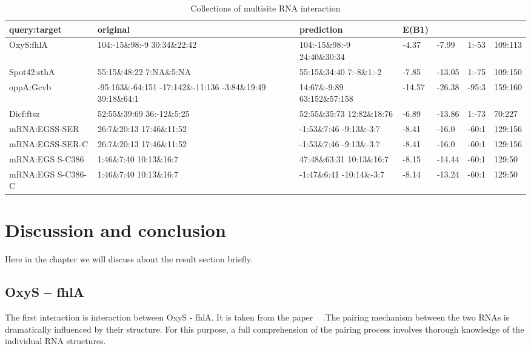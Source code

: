 \documentclass[twoside,a4paper]{report}
\begin{document}
	
\begin{table}[H]
	
	\label{table:2}
	\begin{tabular}{ p{2cm}p{2.8cm}|p{2.8cm}p{1cm}p{1cm}|p{1cm}p{1cm}}
		\hline
		query:target& original& prediction& \rotatebox[origin=c]{90} {E(B1)}  &\rotatebox[origin=c]{90}{E(B1+B2)}  &\rotatebox[origin=c]{90}{1st index}  &\rotatebox[origin=c]{90}{length} \\
		\hline
		OxyS:fhlA&104:-15\&98:-9 30:34\&22:42
		&104:-15\&98:-9 24:40\&30:34&-4.37 &-7.99 &1:-53&109:113\\
		\hline
		Spot42:sthA&55:15\&48:22  7:NA\&5:NA & 55:15\&34:40 7:-8\&1:-2
		& -7.85 &-13.05 & 1:-75 &109:150 \\
		\hline
		oppA:Gcvb &-95:163\&-64:151 -17:142\&-11:136 -3:84\&19:49 39:18\&64:1  &14:67\&-9:89 63:152\&57:158
		
		& -14.57 &-26.38 & -95:3 &159:160\\
		\hline
		Dicf:ftsz&52:55\&39:69   \hbox{36:-12\&5:25}  &52:55\&35:73 12:82\&18:76	& -6.89 &-13.86 &1:-73 &70:227 \\
		\hline
		mRNA:EGSS-SER &26:7\&20:13 17:46\&11:52  &-1:53\&7:46 \hbox{-9:13\&-3:7}
		 & -8.41 &-16.0 & -60:1 &129:156 \\
		\hline
		mRNA:EGSS-SER-C &26:7\&20:13 17:46\&11:52  &-1:53\&7:46 \hbox{-9:13\&-3:7}
		 & -8.41 &-16.0 & -60:1 &129:156 \\
		\hline
		mRNA:EGS S-C386 &1:46\&7:40 10:13\&16:7 &
		47:48\&63:31 10:13\&16:7
		  & -8.15&-14.44 & -60:1 &129:50 \\
		\hline
		mRNA:EGS S-C386-C &1:46\&7:40 10:13\&16:7
		 &-1:47\&6:41 \hbox{-10:14\&-3:7}
		  & -8.14 &-13.24 & -60:1 &129:50 \\
		\hline
	\end{tabular}
	\caption{Collections of multisite RNA interaction }	
\end{table}


	
	\chapter{Discussion and conclusion}
	
	Here in the chapter we will discuss about the result section briefly.
	
	
	\section{OxyS – fhlA}
	 The first interaction is interaction between OxyS - fhlA. It is taken from the paper ~\cite{argaman2000fhla} .The pairing mechanism between the two RNAs is dramatically influenced by their structure. For this purpose, a full comprehension of the pairing process involves thorough knowledge of the individual RNA structures. \\
	 
\end{document}
